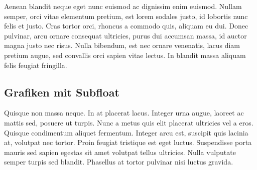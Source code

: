 Aenean blandit neque eget nunc euismod ac dignissim enim euismod. Nullam semper, orci vitae elementum pretium, est lorem sodales justo, id lobortis nunc felis et justo. Cras tortor orci, rhoncus a commodo quis, aliquam eu dui. Donec pulvinar, arcu ornare consequat ultricies, purus dui accumsan massa, id auctor magna justo nec risus. Nulla bibendum, est nec ornare venenatis, lacus diam pretium augue, sed convallis orci sapien vitae lectus. In blandit massa aliquam felis feugiat fringilla.

\subsection{Grafiken mit Subfloat}
\label{sec:chapter03:grafiken:subfloat}
Quisque non massa neque. In at placerat lacus. Integer urna augue, laoreet ac mattis sed, posuere ut turpis. Nunc a metus quis elit placerat ultricies vel a eros. Quisque condimentum aliquet fermentum. Integer arcu est, suscipit quis lacinia at, volutpat nec tortor. Proin feugiat tristique est eget luctus. Suspendisse porta mauris sed sapien egestas sit amet volutpat tellus ultricies. Nulla vulputate semper turpis sed blandit. Phasellus at tortor pulvinar nisi luctus gravida.

